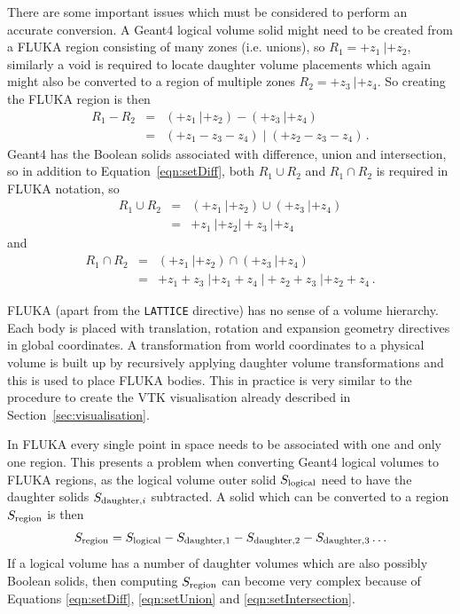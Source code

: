 \documentclass[final,5p,times,twocolumn]{elsarticle}
\newcommand{\fluka}[1]{\texttt{\MakeUppercase{#1}}}
\begin{document}
There are some important issues which must be considered to perform an accurate conversion. 
A Geant4 logical volume solid might need to be created from a FLUKA region consisting of many zones (i.e. unions), 
so $R_1 = +z_1\: | +z_2$, similarly a void is required to locate daughter volume placements which again 
might also be converted to a region of multiple zones $R_2= +z_3 \: | +z_4$. So creating the FLUKA region is then 
\begin{eqnarray}
R_1 - R_2 	& = & (+z_1 \: | +z_2) - ( +z_3 \: | +z_4) 			\\
			& = & (+z_1 - z_3 - z_4) \;  | \; (+z_2 - z_3 - z_4)\,.	
\label{eqn:setDiff}
\end{eqnarray}
Geant4 has the Boolean solids associated with difference, union and intersection, so in addition to 
Equation~\ref{eqn:setDiff}, both $R_1 \cup R_2$ and $R_1 \cap R_2$ is required in FLUKA notation, so 
\begin{eqnarray}
R_1 \cup R_2 	& = & (+z_1 \: | +z_2)  \cup ( +z_3 \: | +z_4) \\
			& = & +z_1 \: | +z_2 |  +z_3 \: | +z_4
\label{eqn:setUnion}
\end{eqnarray}
and 
\begin{eqnarray}
R_1 \cap R_2 	& = & (+z_1 \: | +z_2) \cap ( +z_3 \: | +z_4) \\
			& = & +z_1 +z_3  \; | +z_1 +z_4 \; | +z_2 +z_3 \; | +z_2 +z_4\,.
\label{eqn:setIntersection}
\end{eqnarray}

FLUKA (apart from the \fluka{lattice} directive) has no sense of a volume hierarchy. Each body is placed with 
translation, rotation and expansion geometry directives in global coordinates. A transformation from world 
coordinates to a physical volume is built up by recursively applying daughter volume transformations 
and  this is used to place FLUKA bodies. This  in practice is very similar to the procedure to create the 
VTK visualisation already described in Section~\ref{sec:visualisation}.

In FLUKA every single point in space needs to be associated with one and only one region. This presents a problem 
when converting Geant4 logical volumes to FLUKA regions, as the logical volume outer solid $S_{\rm logical}$ 
need to have the daughter  solids $S_{{\rm daughter},i}$ subtracted. A solid which can be converted 
to a region $S_{\rm region}$ is then 
\begin{equation}
S_{\rm region} =  S_{\rm logical} - S_{\rm daughter,1} - S_{\rm daughter,2} - S_{\rm daughter,3} \ldots 
\label{eqn:logicalSubtraction}
\end{equation} 
If a logical volume has a number of daughter volumes which are also possibly Boolean solids, then computing 
$S_{\rm region}$ can become very complex because of Equations \ref{eqn:setDiff}, \ref{eqn:setUnion} and 
\ref{eqn:setIntersection}. 
\end{document}
